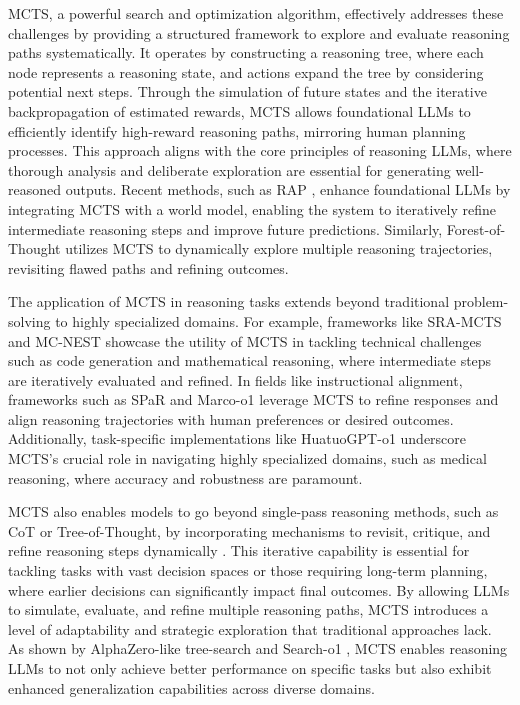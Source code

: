 MCTS, a powerful search and optimization algorithm, effectively addresses these challenges by providing a structured framework to explore and evaluate reasoning paths systematically. 
It operates by constructing a reasoning tree, where each node represents a reasoning state, and actions expand the tree by considering potential next steps. 
Through the simulation of future states and the iterative backpropagation of estimated rewards, MCTS allows foundational LLMs to efficiently identify high-reward reasoning paths, mirroring human planning processes. 
This approach aligns with the core principles of reasoning LLMs, where thorough analysis and deliberate exploration are essential for generating well-reasoned outputs. 
Recent methods, such as RAP \cite{hao2023reasoning}, enhance foundational LLMs by integrating MCTS with a world model, enabling the system to iteratively refine intermediate reasoning steps and improve future predictions. 
Similarly, Forest-of-Thought \cite{DBLP:journals/corr/abs-2412-09078} utilizes MCTS to dynamically explore multiple reasoning trajectories, revisiting flawed paths and refining outcomes.





The application of MCTS in reasoning tasks extends beyond traditional problem-solving to highly specialized domains. 
For example, frameworks like SRA-MCTS \cite{DBLP:journals/corr/abs-2411-11053} and MC-NEST \cite{DBLP:journals/corr/abs-2411-15645} showcase the utility of MCTS in tackling technical challenges such as code generation and mathematical reasoning, where intermediate steps are iteratively evaluated and refined. 
In fields like instructional alignment, frameworks such as SPaR \cite{DBLP:journals/corr/abs-2412-11605} and Marco-o1 \cite{Marco_o1} leverage MCTS to refine responses and align reasoning trajectories with human preferences or desired outcomes. 
Additionally, task-specific implementations like HuatuoGPT-o1 \cite{Huatuo-o1} underscore MCTS's crucial role in navigating highly specialized domains, such as medical reasoning, where accuracy and robustness are paramount.

MCTS also enables models to go beyond single-pass reasoning methods, such as CoT or Tree-of-Thought, by incorporating mechanisms to revisit, critique, and refine reasoning steps dynamically \cite{DBLP:journals/corr/abs-2407-01476, DBLP:journals/corr/abs-2409-09584}. 
This iterative capability is essential for tackling tasks with vast decision spaces or those requiring long-term planning, where earlier decisions can significantly impact final outcomes. 
By allowing LLMs to simulate, evaluate, and refine multiple reasoning paths, MCTS introduces a level of adaptability and strategic exploration that traditional approaches lack. 
As shown by AlphaZero-like tree-search \cite{wan2024alphazero} and Search-o1 \cite{li2025search}, MCTS enables reasoning LLMs to not only achieve better performance on specific tasks but also exhibit enhanced generalization capabilities across diverse domains.





